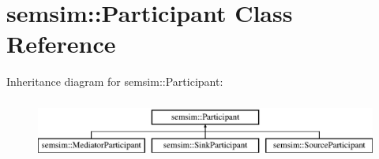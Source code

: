 \hypertarget{classsemsim_1_1Participant}{}\section{semsim\+:\+:Participant Class Reference}
\label{classsemsim_1_1Participant}
Inheritance diagram for semsim\+:\+:Participant\+:\begin{figure}[H]
\begin{center}
\leavevmode
\includegraphics[height=2.000000cm]{classsemsim_1_1Participant}
\end{center}
\end{figure}
